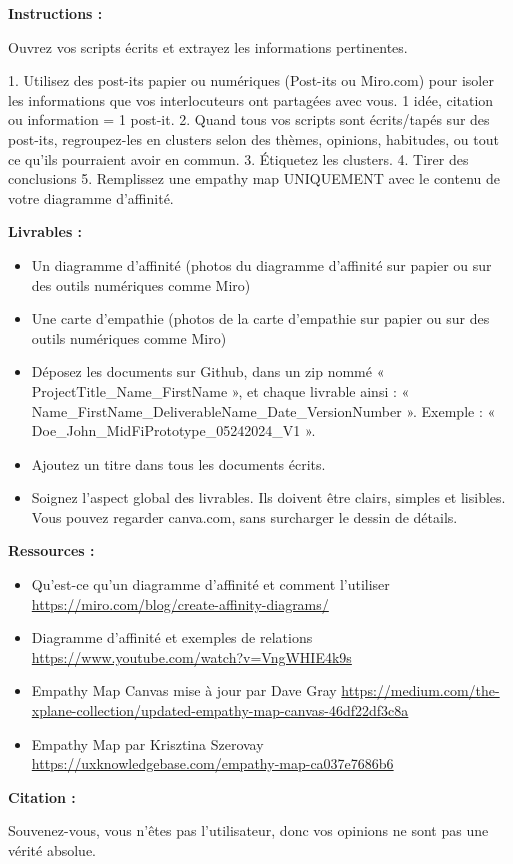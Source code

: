 \makeheaderfiles

\textbf{Instructions :}

Ouvrez vos scripts écrits et extrayez les informations pertinentes.

1. Utilisez des post-its papier ou numériques (Post-its ou Miro.com) pour isoler les informations que vos interlocuteurs ont partagées avec vous.
1 idée, citation ou information = 1 post-it.
2. Quand tous vos scripts sont écrits/tapés sur des post-its, regroupez-les en clusters selon des thèmes, opinions, habitudes, ou tout ce qu'ils pourraient avoir en commun.
3. Étiquetez les clusters.
4. Tirer des conclusions
5. Remplissez une empathy map UNIQUEMENT avec le contenu de votre diagramme d'affinité.

\textbf{Livrables :}

\begin{itemize}
\item Un diagramme d'affinité (photos du diagramme d'affinité sur papier ou sur des outils numériques comme Miro)
\item Une carte d'empathie (photos de la carte d'empathie sur papier ou sur des outils numériques comme Miro)
\item Déposez les documents sur Github, dans un zip nommé « ProjectTitle\_Name\_FirstName », et chaque livrable ainsi : « Name\_FirstName\_DeliverableName\_Date\_VersionNumber ». Exemple : « Doe\_John\_MidFiPrototype\_05242024\_V1 ».
\item Ajoutez un titre dans tous les documents écrits.
\item Soignez l'aspect global des livrables. Ils doivent être clairs, simples et lisibles. Vous pouvez regarder canva.com, sans surcharger le dessin de détails.
\end{itemize}

\textbf{Ressources :}

\begin{itemize}
\item Qu'est-ce qu'un diagramme d'affinité et comment l'utiliser \url{https://miro.com/blog/create-affinity-diagrams/}
\item Diagramme d'affinité et exemples de relations \url{https://www.youtube.com/watch?v=VngWHIE4k9s}
\item Empathy Map Canvas mise à jour par Dave Gray \url{https://medium.com/the-xplane-collection/updated-empathy-map-canvas-46df22df3c8a}
\item Empathy Map par Krisztina Szerovay \url{https://uxknowledgebase.com/empathy-map-ca037e7686b6}
\end{itemize}

\textbf{Citation :}

Souvenez-vous, vous n'êtes pas l'utilisateur, donc vos opinions ne sont pas une vérité absolue.

